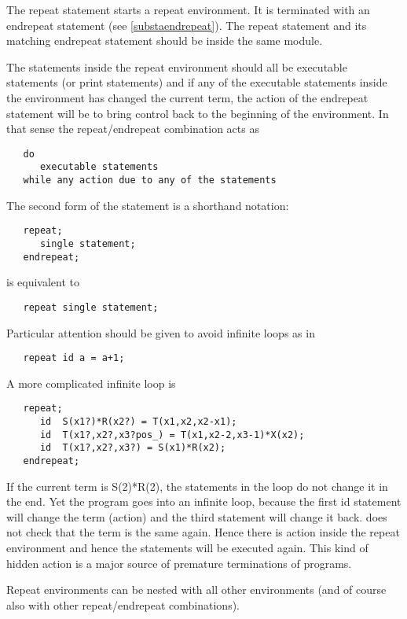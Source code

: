 \noindent The repeat statement starts a
repeat environment. It is terminated with an 
endrepeat statement (see \ref{substaendrepeat}). The 
repeat statement and its matching endrepeat statement should be inside the 
same module. \vspace{4mm}

\noindent The statements inside the repeat environment should all be 
executable statements (or print statements) and if any of the executable 
statements inside the environment has changed the current term, the action 
of the endrepeat statement will be to bring control back to the beginning 
of the environment. In that sense the repeat/endrepeat combination acts as
\begin{verbatim}
   do
      executable statements
   while any action due to any of the statements
\end{verbatim}
The second form of the statement is a shorthand notation:
\begin{verbatim}
   repeat;
      single statement;
   endrepeat;
\end{verbatim}
is equivalent to
\begin{verbatim}
   repeat single statement;
\end{verbatim}
Particular attention should be given to avoid infinite 
loops as in
\begin{verbatim}
   repeat id a = a+1;
\end{verbatim}
A more complicated infinite loop is
\begin{verbatim}
   repeat;
      id  S(x1?)*R(x2?) = T(x1,x2,x2-x1);
      id  T(x1?,x2?,x3?pos_) = T(x1,x2-2,x3-1)*X(x2);
      id  T(x1?,x2?,x3?) = S(x1)*R(x2);
   endrepeat;
\end{verbatim}
If the current term is S(2)*R(2), the statements in the loop do not change 
it in the end. Yet the program goes into an infinite loop, because the 
first id statement will change the term (action) and the third statement 
will change it back. {\FORM} does not check that the term is the same 
again. Hence there is action inside the repeat environment and hence the 
statements will be executed again. This kind of hidden action is a major 
source of premature 
terminations of {\FORM} programs. \vspace{4mm}

\noindent Repeat environments can be nested with all other 
environments (and of course also with other repeat/endrepeat combinations). 
\vspace{10mm}


